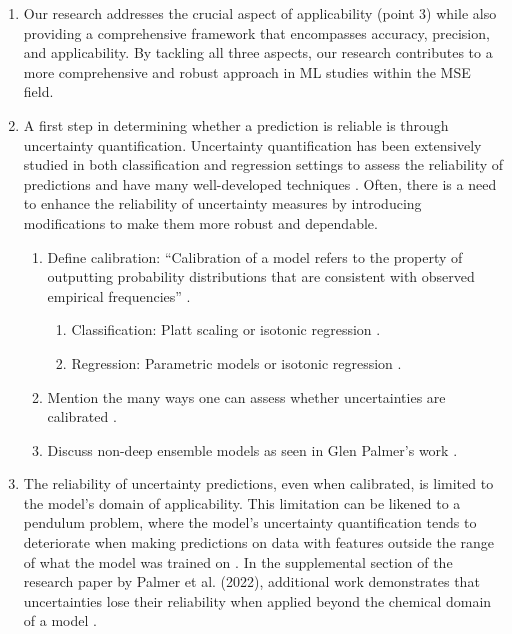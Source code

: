 \begin{enumerate}
    \item Our research addresses the crucial aspect of applicability (point 3) while also providing a comprehensive framework that encompasses accuracy, precision, and applicability. By tackling all three aspects, our research contributes to a more comprehensive and robust approach in ML studies within the MSE field.
    
    \item A first step in determining whether a prediction is reliable is through uncertainty quantification. Uncertainty quantification has been extensively studied in both classification and regression settings to assess the reliability of predictions and have many well-developed techniques \cite{Abdar2021, Scalia2020, Tran2019, Caruana2005, Kull2017}. Often, there is a need to enhance the reliability of uncertainty measures by introducing modifications to make them more robust and dependable.
    
    \begin{enumerate}
    
        \item Define calibration: ``Calibration of a model refers to the property of outputting probability distributions that are consistent with observed empirical frequencies'' \cite{Scalia2020}.
        
        \begin{enumerate}
            \item Classification: Platt scaling or isotonic regression \cite{Caruana2005}.
            \item Regression: Parametric models or isotonic regression \cite{Busk2022, Morgan2020, Hirschfeld2020}.
        \end{enumerate}
        
        \item Mention the many ways one can assess whether uncertainties are calibrated \cite{Pernot2022}.
        
        \item Discuss non-deep ensemble models as seen in Glen Palmer's work \cite{Palmer2022}.
        
    \end{enumerate}
    
\item The reliability of uncertainty predictions, even when calibrated, is limited to the model's domain of applicability. This limitation can be likened to a pendulum problem, where the model's uncertainty quantification tends to deteriorate when making predictions on data with features outside the range of what the model was trained on \cite{Caldeira2020}. In the supplemental section of the research paper by Palmer et al. (2022), additional work demonstrates that uncertainties lose their reliability when applied beyond the chemical domain of a model \cite{Palmer2022}.


\end{enumerate}
